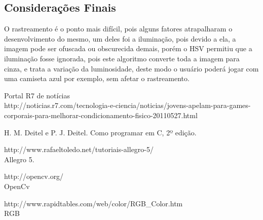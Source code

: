 \documentclass{sciposter}
\begin{document}
\begin{multicols}{3}
\section{Considerações Finais}

O rastreamento é o ponto mais difícil, pois alguns fatores atrapalharam o desenvolvimento do mesmo, um deles foi a iluminação, pois devido a ela, a imagem pode ser ofuscada ou obscurecida demais, porém o HSV permitiu que a iluminação fosse ignorada, pois este algoritmo converte toda a imagem para cinza, e trata a variação da luminosidade, deste modo o usuário poderá jogar com uma camiseta azul por exemplo, sem afetar o rastreamento.



\begin{thebibliography}{5}

  Portal R7 de notícias 
\\
\newblock http://noticias.r7.com/tecnologia-e-ciencia/noticias/jovens-apelam-para-games-corporais-para-melhorar-condicionamento-fisico-20110527.html

H. M. Deitel e P. J. Deitel.
\newblock Como programar em C, 2º edição.

 http://www.rafaeltoledo.net/tutoriais-allegro-5/
\\
\newblock Allegro 5.

 http://opencv.org/
\\
\newblock OpenCv

 http://www.rapidtables.com/web/color/RGB\_Color.htm \\
\newblock RGB

\end{thebibliography}

\end{multicols}
\end{document}
